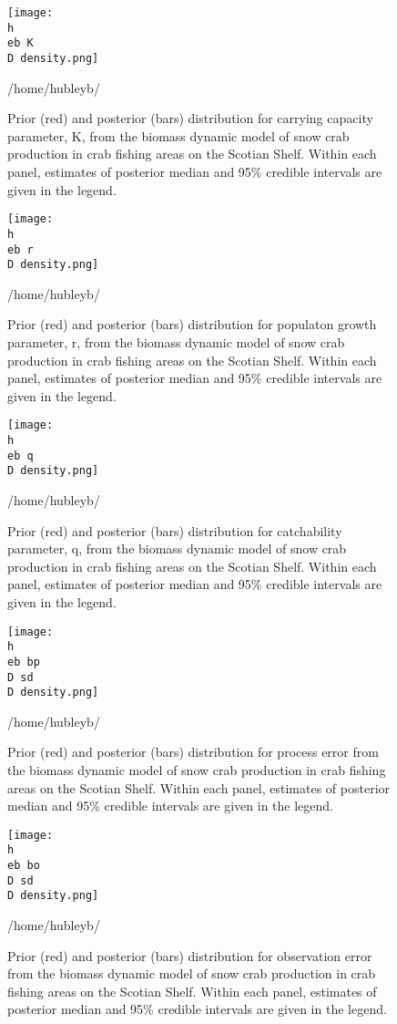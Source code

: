 \documentclass[11pt]{article}
\newcommand{\D}{.}
\newcommand{\h}{/home/hubleyb/}
\newcommand{\eb}{bio.data/bio.snowcrab/assessments/2016/figures/bugs/survey/}
\begin{document}
\begin{figure}
    
    \texttt{[image: \\h \\eb K\\D density.png]}
    \caption{Prior (red) and posterior (bars) distribution for carrying capacity parameter, K, from the biomass dynamic model of snow crab production in crab fishing areas on the Scotian Shelf. Within each panel, estimates of posterior median and 95\% credible intervals are given in the legend.}
  
\h \end{figure}
\clearpage

\begin{figure}
    
    \texttt{[image: \\h \\eb r\\D density.png]}
    \caption{Prior (red) and posterior (bars) distribution for populaton growth parameter, r, from the biomass dynamic model of snow crab production in crab fishing areas on the Scotian Shelf. Within each panel, estimates of posterior median and 95\% credible intervals are given in the legend.}
  
\h \end{figure}
\clearpage

\begin{figure}
    
    \texttt{[image: \\h \\eb q\\D density.png]}
    \caption{Prior (red) and posterior (bars) distribution for catchability parameter, q, from the biomass dynamic model of snow crab production in crab fishing areas on the Scotian Shelf. Within each panel, estimates of posterior median and 95\% credible intervals are given in the legend.}
  
\h \end{figure}
\clearpage



\begin{figure}
    
    \texttt{[image: \\h \\eb bp\\D sd\\D density.png]}
    \caption{Prior (red) and posterior (bars) distribution for process error from the biomass dynamic model of snow crab production in crab fishing areas on the Scotian Shelf. Within each panel, estimates of posterior median and 95\% credible intervals are given in the legend.}
  
\h \end{figure}
\clearpage

\begin{figure}
    
    \texttt{[image: \\h \\eb bo\\D sd\\D density.png]}
    \caption{Prior (red) and posterior (bars) distribution for observation error from the biomass dynamic model of snow crab production in crab fishing areas on the Scotian Shelf. Within each panel, estimates of posterior median and 95\% credible intervals are given in the legend.}
  
\h \end{figure}
\clearpage
\end{document}
